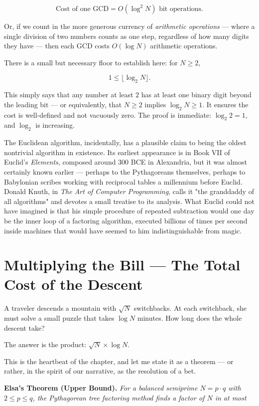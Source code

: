 \documentclass[11pt,twoside,openright]{book}
\theoremstyle{definition}
\theoremstyle{remark}
\begin{document}
\[\text{Cost of one GCD} = O(\log^2 N) \text{ bit operations.}\]

Or, if we count in the more generous currency of \textit{arithmetic operations} --- where a single division of two numbers counts as one step, regardless of how many digits they have --- then each GCD costs $O(\log N)$ arithmetic operations.

There is a small but necessary floor to establish here: for $N \ge 2$,

\[1 \le \lfloor \log_2 N \rfloor.\]

This simply says that any number at least $2$ has at least one binary digit beyond the leading bit --- or equivalently, that $N \ge 2$ implies $\log_2 N \ge 1$. It ensures the cost is well-defined and not vacuously zero. The proof is immediate: $\log_2 2 = 1$, and $\log_2$ is increasing.

The Euclidean algorithm, incidentally, has a plausible claim to being the oldest nontrivial algorithm in existence. Its earliest appearance is in Book VII of Euclid's \textit{Elements}, composed around 300 BCE in Alexandria, but it was almost certainly known earlier --- perhaps to the Pythagoreans themselves, perhaps to Babylonian scribes working with reciprocal tables a millennium before Euclid. Donald Knuth, in \textit{The Art of Computer Programming}, calls it "the granddaddy of all algorithms" and devotes a small treatise to its analysis. What Euclid could not have imagined is that his simple procedure of repeated subtraction would one day be the inner loop of a factoring algorithm, executed billions of times per second inside machines that would have seemed to him indistinguishable from magic.



\section{Multiplying the Bill --- The Total Cost of the Descent}

A traveler descends a mountain with $\sqrt{N}$ switchbacks. At each switchback, she must solve a small puzzle that takes $\log N$ minutes. How long does the whole descent take?

The answer is the product: $\sqrt{N} \times \log N$.

This is the heartbeat of the chapter, and let me state it as a theorem --- or rather, in the spirit of our narrative, as the resolution of a bet.

\textbf{Elsa's Theorem (Upper Bound).} \textit{For a balanced semiprime $N = p \cdot q$ with $2 \le p \le q$, the Pythagorean tree factoring method finds a factor of $N$ in at most}
\end{document}
